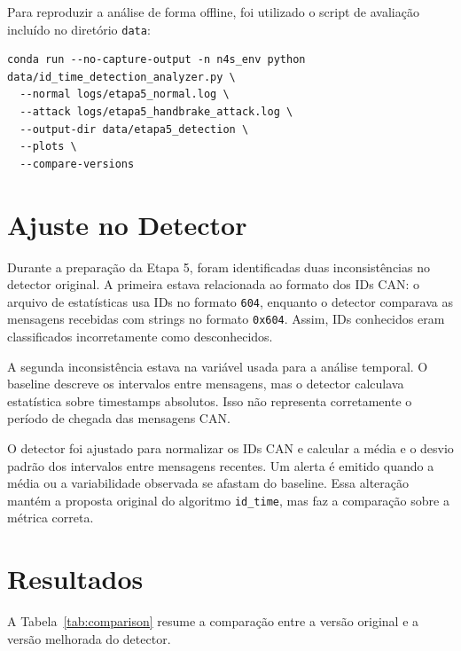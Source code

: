 \documentclass[12pt,a4paper]{article}
\begin{document}
Para reproduzir a an\'alise de forma offline, foi utilizado o script de avalia\c{c}\~ao
inclu\'ido no diret\'orio \texttt{data}:

\begin{center}
\begin{minipage}{0.92\linewidth}
\begin{Verbatim}[fontsize=\footnotesize,breaklines=true,breakanywhere=true]
conda run --no-capture-output -n n4s_env python data/id_time_detection_analyzer.py \
  --normal logs/etapa5_normal.log \
  --attack logs/etapa5_handbrake_attack.log \
  --output-dir data/etapa5_detection \
  --plots \
  --compare-versions
\end{Verbatim}
\end{minipage}
\end{center}

\section{Ajuste no Detector}

Durante a prepara\c{c}\~ao da Etapa 5, foram identificadas duas inconsist\^encias no
detector original. A primeira estava relacionada ao formato dos IDs CAN: o arquivo de
estat\'isticas usa IDs no formato \texttt{604}, enquanto o detector comparava as
mensagens recebidas com strings no formato \texttt{0x604}. Assim, IDs conhecidos eram
classificados incorretamente como desconhecidos.

A segunda inconsist\^encia estava na vari\'avel usada para a an\'alise temporal. O
baseline descreve os intervalos entre mensagens, mas o detector calculava estat\'istica
sobre timestamps absolutos. Isso n\~ao representa corretamente o per\'iodo de chegada das
mensagens CAN.

O detector foi ajustado para normalizar os IDs CAN e calcular a m\'edia e o desvio
padr\~ao dos intervalos entre mensagens recentes. Um alerta \'e emitido quando a m\'edia
ou a variabilidade observada se afastam do baseline. Essa altera\c{c}\~ao mant\'em a
proposta original do algoritmo \texttt{id\_time}, mas faz a compara\c{c}\~ao sobre a
m\'etrica correta.

\section{Resultados}

A Tabela~\ref{tab:comparison} resume a compara\c{c}\~ao entre a vers\~ao original e a
vers\~ao melhorada do detector.
\end{document}
